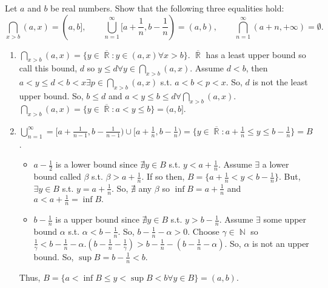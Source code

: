 \documentclass[12pt,letterpaper,boxed]{hmcpset}
\DeclareMathOperator{\R}{\mathbb{R}}
\DeclareMathOperator{\N}{\mathbb{N}}
\begin{document}

\begin{problem}[Exercise 5.4.]
Let $a$ and $b$ be real numbers. Show that the following three equalities hold: $$\bigcap_{x > b}(a,x) = (a,b], \quad \quad \bigcup_{n=1}^{\infty}[a + \frac{1}{n}, b - \frac{1}{n})=(a,b), \quad \quad \bigcap_{n = 1}^{\infty}(a + n,+\infty) = \emptyset.$$
\end{problem}


\begin{solution}
\begin{enumerate}
	\itemsep0em
	\item $\bigcap_{x > b}(a,x) = \{y \in \overline{\R} : y \in (a, x) \forall x > b\}$. $\overline{\R}$ has a least upper bound so call this bound, $d$ so $y \leq d \forall y \in \bigcap_{x > b} (a, x)$. Assume $d < b$, then $a < y \leq d < b < x \exists p \in \bigcap_{x > b}(a,x)$ s.t. $a < b < p < x.$ So, $d$ is not the least upper bound. So, $b \leq d$ and $a < y \leq b \leq d \forall \bigcap_{x>b}(a, x)$. $\bigcap_{x>b}(a, x)=\{y \in \overline{\R} : a < y \leq b\} = (a, b].$
	\item $\bigcup_{n=1}^{\infty} = [a + \frac{1}{n - 1}, b - \frac{1}{n - 1}) \cup [a + \frac{1}{n}, b - \frac{1}{n}) = \{ y \in \overline{\R} : a + \frac{1}{n} \leq y \leq b - \frac{1}{n} \} = B$.
	\vspace{-2mm}
	\begin{itemize}
		\itemsep0em
		\item $a - \frac{1}{2}$ is a lower bound since $\nexists y \in B$ s.t. $y < a + \frac{1}{n}$. Assume $\exists$ a lower bound called $\beta$ s.t. $\beta > a + \frac{1}{n}.$ If so then, $B = \{a + \frac{1}{n} < y < b - \frac{1}{n} \}.$ But, $\exists y\in B$ s.t. $y = a + \frac{1}{n}.$ So, $\nexists $ any $\beta$ so $\inf B = a + \frac{1}{n}$ and $a < a + \frac{1}{n}=\inf B.$ 
		\item $b - \frac{1}{n}$ is a upper bound since $\nexists y \in B$ s.t. $y > b - \frac{1}{n}$. Assume $\exists$ some upper bound $\alpha$ s.t. $\alpha < b - \frac{1}{n}.$ So, $b - \frac{1}{n} - \alpha > 0.$ Choose $\gamma \in \N$ so $\frac{1}{\gamma} < b - \frac{1}{n} - \alpha. (b - \frac{1}{n} - \frac{1}{\gamma}) > b - \frac{1}{n} - (b - \frac{1}{n} - \alpha).$ So, $\alpha$ is not an upper bound. So, $\sup B = b - \frac{1}{n} < b.$ 
	\end{itemize} 
	Thus, $B = \{a < \inf B \leq y < \sup B < b \forall y \in B\} = (a,b)$.

\end{enumerate}
\end{solution}
\end{document}
